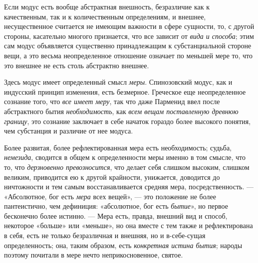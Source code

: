 Если модус есть вообще абстрактная внешность, безразличие как к
качественным, так и к количественным определениям, и внешнее,
несущественное считается не имеющим важности в сфере сущности, то, с другой
стороны, касательно многого признается, что все зависит от
{\em вида и способа}; этим сам модус объявляется
существенно принадлежащим к субстанциальной стороне вещи, а это весьма
неопределенное отношение означает по меньшей мере то, что это внешнее не
есть столь абстрактно внешнее.

Здесь модус имеет определенный смысл {\em меры}.
Спинозовский модус, как и индусский принцип изменения, есть безмерное.
Греческое еще неопределенное сознание того, что
{\em все имеет меру}, так что даже Парменид ввел после
абстрактного бытия {\em необходимость}, как
{\em всем вещам поставленную древнюю границу}, это
сознание заключает в себе начаток гораздо более высокого понятия, чем
субстанция и различие от нее модуса.

Более развитая, более рефлектированная мера есть необходимость; судьба,
{\em немезида}, сводится в общем к определенности меры
именно в том смысле, что то, что {\em дерзновенно
превозносится}, что делает себя слишком высоким, слишком великим,
приводится ею к другой крайности, унижается, доводится до ничтожности и тем
самым восстанавливается средняя мера, посредственность. — «Абсолютное, бог
есть {\em мера} всех вещей», — это положение не более
пантеистично, чем дефиниция: «абсолютное, бог есть
{\em бытие}», но первое бесконечно более истинно. —
Мера есть, правда, внешний вид и способ, некоторое «больше» или «меньше»,
но она вместе с тем также и рефлектирована в себя, есть не только
безразличная и внешняя, но и в-себе-сущая определенность; она, таким
образом, есть {\em конкретная истина бытия}; народы
поэтому почитали в мере нечто неприкосновенное, святое.

